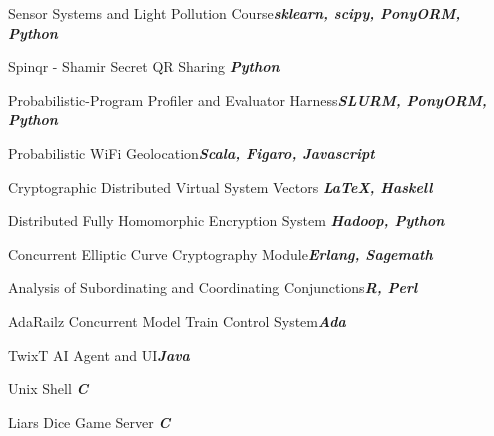 \documentclass{article}
\newenvironment{*mylist}[2]{
  \subsubsection*{#1\hfill\small#2}
  \small
  \begin{list}{}{}
   \setlength{\topsep}{0pt}
   \setlength{\itemsep}{1pt}
   \setlength{\parskip}{0pt}
   \setlength{\parsep}{0pt}}{\end{list}\normalsize}
\newcommand{\LUx}[1]{{\bf\em #1}}
\begin{document}
\small
\vspace{-.08in}\begin{*mylist}{}{}
\item Sensor Systems and Light Pollution Course\hfill\LUx{sklearn, scipy, PonyORM, Python}
\item Spinqr - Shamir Secret QR Sharing \hfill\LUx{Python}
\item Probabilistic-Program Profiler and Evaluator Harness\hfill\LUx{SLURM, PonyORM, Python}
\item Probabilistic WiFi Geolocation\hfill\LUx{Scala, Figaro, Javascript}
\item Cryptographic Distributed Virtual System Vectors \hfill\LUx{\LaTeX, Haskell}
\item Distributed Fully Homomorphic Encryption System \hfill\LUx{Hadoop, Python}
\item Concurrent Elliptic Curve Cryptography Module\hfill\LUx{Erlang, Sagemath}
\item Analysis of Subordinating and Coordinating Conjunctions\hfill\LUx{R, Perl}
\item AdaRailz Concurrent Model Train Control System\hfill\LUx{Ada}
\item TwixT AI Agent and UI\hfill\LUx{Java}
\item Unix Shell \hfill\LUx{C}
\item Liars Dice Game Server \hfill\LUx{C}
\end{*mylist}
\end{document}
